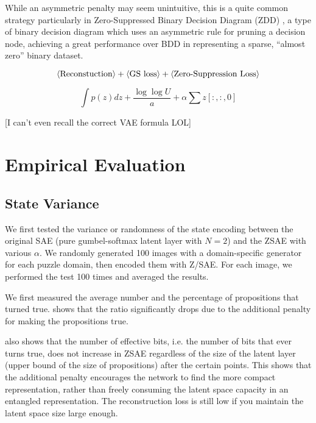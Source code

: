 While an asymmetric penalty may seem unintuitive, this is a quite common
strategy particularly in Zero-Suppressed Binary Decision Diagram (ZDD)
\cite{Minato??}, a type of binary decision diagram \cite{Bryent88} which
uses an asymmetric rule for pruning a decision node, achieving a great
performance over BDD in representing a sparse, ``almost zero'' binary dataset.

\[
 {\left<\text{Reconstuction}\right>} + {\left<\text{GS loss}\right>} + {\left<\text{Zero-Suppression Loss}\right>}
\]

\[
 \int p(z)dz + \frac{\log {\log{U}}}{a} + \alpha \sum z[:,:,0]
\]

[I can't even recall the correct VAE formula LOL]

\section{Empirical Evaluation}
\label{evaluation}

\subsection{State Variance}

We first tested the variance or randomness of the state encoding between
the original SAE (pure gumbel-softmax latent layer with $N=2$) and the ZSAE with various $\alpha$.
We randomly generated 100 images with a domain-specific generator for each puzzle domain,
then encoded them with Z/SAE. For each image, we performed the test 100 times and averaged the results.

We first measured the average number and the percentage of propositions that turned true.
 shows that the ratio significantly drops due to the additional penalty
for making the propositions true.

 also shows that the number of effective bits,
i.e. the number of bits that ever turns true, does not increase in ZSAE
regardless of the size of the latent layer (upper bound of the size of
propositions) after the certain points.  This shows that the additional
penalty encourages the network to find the more compact representation,
rather than freely consuming the latent space capacity in an entangled representation.
The reconstruction loss is still low if you maintain the latent space
size large enough.

